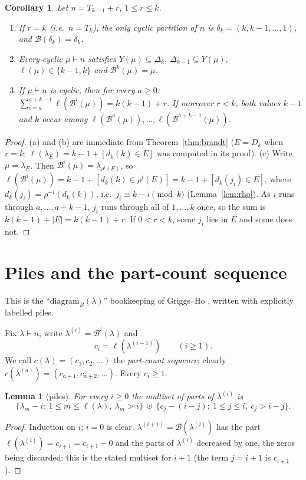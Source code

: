 \documentclass[11pt]{article}
\newtheorem{lemma}[theorem]{Lemma}
\newtheorem{corollary}[theorem]{Corollary}
\theoremstyle{definition}
\newcommand{\B}{\mathcal{B}}
\renewcommand{\le}{\leqslant}
\renewcommand{\ge}{\geqslant}
\begin{document}
\begin{corollary}\label{cor:cyc}
Let $n=T_{k-1}+r$, $1\le r\le k$.
\begin{enumerate}
\item[(a)] If $r=k$ (i.e.\ $n=T_k$), the only cyclic partition of $n$ is $\delta_k=(k,k-1,\dots,1)$, and
$\B(\delta_k)=\delta_k$.
\item[(b)] Every cyclic $\mu\vdash n$ satisfies $Y(\mu)\subseteq\Delta_k$, $\Delta_{k-1}\subseteq Y(\mu)$,
$\ell(\mu)\in\{k-1,k\}$ and $\B^k(\mu)=\mu$.
\item[(c)] If $\mu\vdash n$ is cyclic, then for every $a\ge0$:
$\sum_{i=a}^{a+k-1}\ell(\B^i(\mu))=k(k-1)+r$.  If moreover $r<k$, both values $k-1$ and $k$ occur among
$\ell(\B^a(\mu)),\dots,\ell(\B^{a+k-1}(\mu))$.
\end{enumerate}
\end{corollary}
\begin{proof}
(a) and (b) are immediate from Theorem~\ref{thm:brandt} ($E=D_k$ when $r=k$; $\ell(\lambda_E)=k-1+[d_k(k)\in E]$ was
computed in its proof).  (c) Write $\mu=\lambda_E$.  Then $\B^i(\mu)=\lambda_{\rho^i(E)}$, so
$\ell(\B^i(\mu))=k-1+[d_k(k)\in\rho^i(E)]=k-1+[d_k(j_i)\in E]$, where $d_k(j_i)=\rho^{-i}(d_k(k))$, i.e.\
$j_i\equiv k-i\pmod k$ (Lemma~\ref{lem:rho}).  As $i$ runs through $a,\dots,a+k-1$, $j_i$ runs through all
of $1,\dots,k$ once, so the sum is $k(k-1)+|E|=k(k-1)+r$.  If $0<r<k$, some $j_i$ lies in $E$ and some does not.
\end{proof}

\section{Piles and the part-count sequence}\label{sec:piles}

This is the ``$\mathrm{diagram}_B(\lambda)$'' bookkeeping of Griggs--Ho \cite[\S3]{GH}, written with
explicitly labelled piles.

Fix $\lambda\vdash n$, write $\lambda^{(i)}=\B^i(\lambda)$ and
\[c_i=\ell(\lambda^{(i-1)})\qquad(i\ge1).\]
We call $c(\lambda)=(c_1,c_2,\dots)$ the \emph{part-count sequence}; clearly
$c(\lambda^{(a)})=(c_{a+1},c_{a+2},\dots)$.  Every $c_i\ge1$.

\begin{lemma}[piles]\label{lem:piles}
For every $i\ge0$ the multiset of parts of $\lambda^{(i)}$ is
\[\{\lambda_m-i:\ 1\le m\le\ell(\lambda),\ \lambda_m>i\}\ \uplus\ \{c_j-(i-j):\ 1\le j\le i,\ c_j>i-j\}.\]
\end{lemma}
\begin{proof}
Induction on $i$; $i=0$ is clear.  $\lambda^{(i+1)}=\B(\lambda^{(i)})$ has the part $\ell(\lambda^{(i)})=c_{i+1}=c_{i+1}-0$ and
the parts of $\lambda^{(i)}$ decreased by one, the zeros being discarded: this is the stated multiset for
$i+1$ (the term $j=i+1$ is $c_{i+1}$).
\end{proof}
\end{document}

